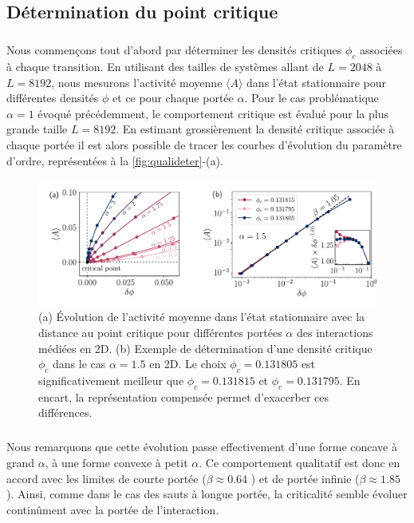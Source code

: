 \subsection{Détermination du point critique}

\subparagraph{}Nous commençons tout d'abord par déterminer les densités critiques $\phi_c$ associées à chaque transition. En utilisant des tailles de systèmes allant de $L=2048$ à $L=8192$, nous mesurons l'activité moyenne $\langle A \rangle$ dans l'état stationnaire pour différentes densités $\phi$ et ce pour chaque portée $\alpha$. Pour le cas problématique $\alpha=1$ évoqué précédemment, le comportement critique est évalué pour la plus grande taille $L=8192$. En estimant grossièrement la densité critique associée à chaque portée il est alors possible de tracer les courbes d'évolution du paramètre d'ordre, représentées à la \autoref{fig:qualideter}-(a).

\begin{figure}[h]
	\centering	\includegraphics[width=\textwidth]{Chapitre3/Figures/BetaGamma/EvolMeanDeter.pdf}
	\caption{(a) Évolution de l'activité moyenne dans l'état stationnaire avec la distance au point critique pour différentes portées $\alpha$ des interactions médiées en 2D. (b) Exemple de détermination d'une densité critique $\phi_c$ dans le cas $\alpha = 1.5$ en 2D. Le choix $\phi_c = 0.131805$ est significativement meilleur que $\phi_c = 0.131815$ et $\phi_c = 0.131795$. En encart, la représentation compensée permet d'exacerber ces différences.}
	\label{fig:qualideter}
\end{figure}

\subparagraph{}Nous remarquons que cette évolution passe effectivement d'une forme concave à grand $\alpha$, à une forme convexe à petit $\alpha$. Ce comportement qualitatif est donc en accord avec les limites de courte portée ($\beta  \approx 0.64$ \cite{lubeck_universal_2004}) et de portée infinie ($\beta\approx 1.85$ \cite{mari_absorbing_2022}). Ainsi, comme dans le cas des sauts à longue portée, la criticalité semble évoluer continûment avec la portée de l'interaction.


